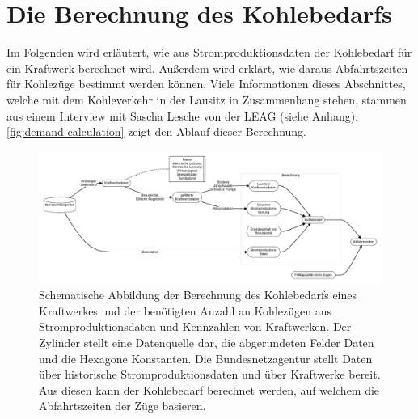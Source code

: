 \section{Die Berechnung des Kohlebedarfs}

Im Folgenden wird erläutert, wie aus Stromproduktionsdaten der Kohlebedarf für ein Kraftwerk berechnet wird. Außerdem wird erklärt, wie daraus Abfahrtszeiten für Kohlezüge bestimmt werden können. Viele Informationen dieses Abschnittes, welche mit dem Kohleverkehr in der Lausitz in Zusammenhang stehen, stammen aus einem Interview mit Sascha Lesche von der LEAG (siehe Anhang). \autoref{fig:demand-calculation} zeigt den Ablauf dieser Berechnung.

\begin{figure}
	\centering
	\includegraphics[width=1.0\linewidth]{images/diagrams/demand-calculation.pdf}
	\caption{Schematische Abbildung der Berechnung des Kohlebedarfs eines Kraftwerkes und der benötigten Anzahl an Kohlezügen aus Stromproduktionsdaten und Kennzahlen von Kraftwerken. Der Zylinder stellt eine Datenquelle dar, die abgerundeten Felder Daten und die Hexagone Konstanten. Die Bundesnetzagentur stellt Daten über historische Stromproduktionsdaten und über Kraftwerke bereit. Aus diesen kann der Kohlebedarf berechnet werden, auf welchem die Abfahrtszeiten der Züge basieren.}
	\label{fig:demand-calculation}
\end{figure}

